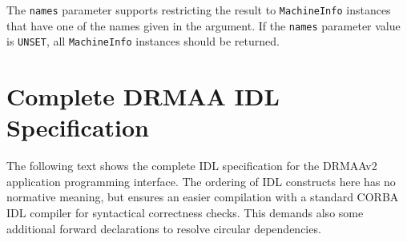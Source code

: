 \documentclass{article}
\newcommand{\h}[1]{\lstinline|#1|}
\begin{document}
The \h{names} parameter supports restricting the result to \h{MachineInfo} instances that have one of the names given in the argument. If the \h{names} parameter value is \h{UNSET}, all \h{MachineInfo} instances should be returned.

\section{Complete DRMAA IDL Specification}
\label{sec:idl}

The following text shows the complete IDL specification for the DRMAAv2 application programming interface. The ordering of IDL constructs here has no normative meaning, but ensures an easier compilation with a standard CORBA IDL compiler for syntactical correctness checks. This demands also some additional forward declarations to resolve circular dependencies.






























\end{document}
